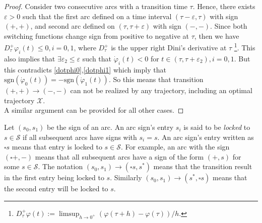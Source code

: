 \begin{proof}
	Consider two consecutive arcs with a transition time $\tau$. 
	Hence, there exists $\varepsilon >0$ such that the first arc defined on a time interval $(\tau-\varepsilon,\tau)$ with sign $(+,+)$, and second arc defined on  $(\tau,\tau+\varepsilon)$ with sign $(-,-)$. Since both switching functions change sign from positive to negative at $\tau$, then we have $D_\tau^+ \varphi_i(t) \le 0, i=0,1$, where $D_\tau^+$ is the upper right Dini's derivative at $\tau$ \footnote{ $D_\tau^+ \varphi(t):=\limsup_{h \to 0^+} (\varphi(\tau+h)-\varphi(\tau))/h.$ }. 
	This also implies that $\exists \varepsilon_2 \le \varepsilon$ such that $\dot\varphi_i(t)<0$ for $t \in (\tau,\tau+\varepsilon_2), i=0,1$. 
	But this contradicts \eqref{dotphi0},\eqref{dotphi1} which imply that $\mbox{sgn}(\dot\varphi_0(t))=-\mbox{sgn}(\dot\varphi_1(t))$. 
	So this means that transition $(+,+) \to (-,-)$ can not be realized by any trajectory, including an optimal trajectory $\mathscr X$. \\
	A similar argument can be provided for all other cases.
\end{proof}

Let $(s_0,s_1)$ be the sign of an arc. 
An arc sign's entry $s_i$  is said to be \emph{locked} to $s \in \mathscr S$ if all subsequent arcs have signs with $s_i=s$. 
An arc sign's entry written as $\square{s}$ means that entry is locked to $s \in \mathscr S$. 
For example, an arc with the sign $(\square{+},-)$ means that all subsequent arcs have a sign of the form $(+,s)$ for some $s \in \mathscr S$.  
The notation $(s_0,s_1) \to (\square{s}, s^*)$  means that the transition result in  the first entry being locked to $s$. 
Similarly $(s_0,s_1) \to (s^*,\square{s})$ means that the second entry will be locked to $s$.

